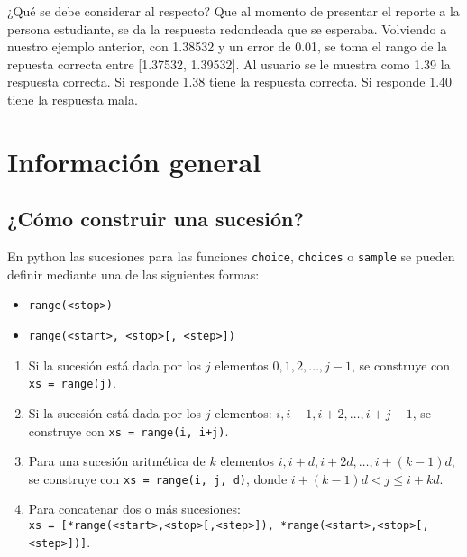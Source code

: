 \documentclass[12pt]{article}
\theoremstyle{definition}
\begin{document}
¿Qué se debe considerar al respecto? Que al momento de presentar el reporte a la persona estudiante, se da la respuesta redondeada que se esperaba. Volviendo a nuestro ejemplo anterior, con 1.38532 y un error de 0.01, se toma el rango de la repuesta correcta entre [1.37532, 1.39532]. Al usuario se le muestra como 1.39 la respuesta correcta. Si responde 1.38 tiene la respuesta correcta. Si responde 1.40 tiene la respuesta mala.

\section{Informaci\'on general}

\subsection{¿Cómo construir una sucesión?}

En python las sucesiones para las funciones \verb|choice|, \verb|choices| o \verb|sample| se pueden definir mediante una de las siguientes formas:
\begin{itemize}
  \item \verb|range(<stop>)|
  \item \verb|range(<start>, <stop>[, <step>])|
\end{itemize}


\begin{enumerate}
  \item Si la sucesión está dada por los $j$ elementos $0, 1, 2, \dots, j - 1$, se construye con \verb|xs = range(j)|.
  \item Si la sucesión está dada por los $j$ elementos: $i, i+1, i+2, \dots, i + j - 1$, se construye con \verb|xs = range(i, i+j)|.
  \item Para una sucesión aritmética de $k$ elementos $i, i + d, i + 2d, \dots, i + (k-1)d$, se construye con \verb|xs = range(i, j, d)|, donde $i + (k-1)d < j \leq i + kd$.
  \item Para concatenar dos o más sucesiones:\\[1ex]
    \verb|xs = [*range(<start>,<stop>[,<step>]), *range(<start>,<stop>[,<step>])]|.
\end{enumerate}
\end{document}
